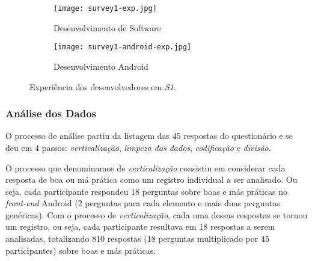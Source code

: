 \begin{figure*}
\centering
\begin{subfigure}{.5\textwidth}
 \centering
 \texttt{[image: survey1-exp.jpg]}
 \caption{Desenvolvimento de Software}
 \label{fig:sub1}
\end{subfigure}%
\begin{subfigure}{.5\textwidth}
 \centering
 \texttt{[image: survey1-android-exp.jpg]}
 \caption{Desenvolvimento Android}
 \label{fig:sub2}
\end{subfigure}
\caption{Experiência dos desenvolvedores em \textit{S1}.}
\label{fig:DadosDemograficos-Exp}
\end{figure*}


\subsubsection{Análise dos Dados}
\label{sub:smells-definition}

O processo de análise partiu da listagem das 45 respostas do questionário e se deu em 4 passos: \textit{verticalização}, \textit{limpeza dos dados}, \textit{codificação} e \textit{divisão}.

O processo que denominamos de \textit{verticalização} consistiu em considerar cada resposta de boa ou má prática como um registro individual a ser analisado. Ou seja, cada participante respondeu 18 perguntas sobre boas e más práticas no \textit{front-end} Android (2 perguntas para cada elemento e mais duas perguntas genéricas). Com o processo de \textit{verticalização}, cada uma dessas respostas se tornou um registro, ou seja, cada participante resultava em 18 respostas a serem analisadas, totalizando 810 respostas (18 perguntas multiplicado por 45 participantes) sobre boas e más práticas.


